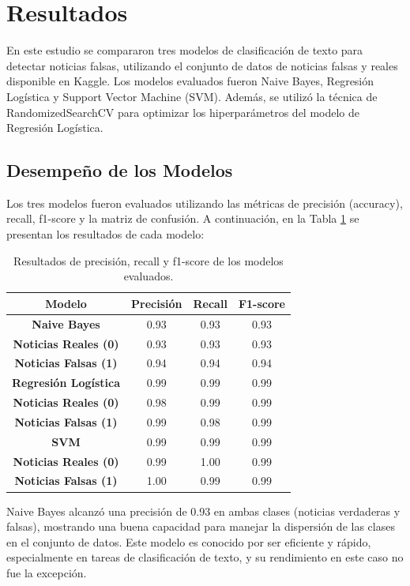 \documentclass[journal]{IEEEtran}
\begin{document}
\section{Resultados}
En este estudio se compararon tres modelos de clasificación de texto para detectar noticias falsas, utilizando el conjunto de datos de noticias falsas y reales disponible en Kaggle. Los modelos evaluados fueron Naive Bayes, Regresión Logística y Support Vector Machine (SVM). Además, se utilizó la técnica de RandomizedSearchCV para optimizar los hiperparámetros del modelo de Regresión Logística.

\subsection{Desempeño de los Modelos}

Los tres modelos fueron evaluados utilizando las métricas de precisión (accuracy), recall, f1-score y la matriz de confusión. A continuación, en la Tabla \ref{table:resultados_modelos} se presentan los resultados de cada modelo:

\begin{table}[ht]
\centering
\begin{tabular}{|c|c|c|c|}
\hline
\textbf{Modelo} & \textbf{Precisión} & \textbf{Recall} & \textbf{F1-score} \\
\hline
\textbf{Naive Bayes} & 0.93 & 0.93 & 0.93 \\
\textbf{Noticias Reales (0)} & 0.93 & 0.93 & 0.93 \\
\textbf{Noticias Falsas (1)} & 0.94 & 0.94 & 0.94 \\
\hline
\textbf{Regresión Logística} & 0.99 & 0.99 & 0.99 \\
\textbf{Noticias Reales (0)} & 0.98 & 0.99 & 0.99 \\
\textbf{Noticias Falsas (1)} & 0.99 & 0.98 & 0.99 \\
\hline
\textbf{SVM} & 0.99 & 0.99 & 0.99 \\
\textbf{Noticias Reales (0)} & 0.99 & 1.00 & 0.99 \\
\textbf{Noticias Falsas (1)} & 1.00 & 0.99 & 0.99 \\
\hline
\end{tabular}
\caption{Resultados de precisión, recall y f1-score de los modelos evaluados.}
\label{table:resultados_modelos}
\end{table}

Naive Bayes alcanzó una precisión de 0.93 en ambas clases (noticias verdaderas y falsas), mostrando una buena capacidad para manejar la dispersión de las clases en el conjunto de datos. Este modelo es conocido por ser eficiente y rápido, especialmente en tareas de clasificación de texto, y su rendimiento en este caso no fue la excepción.
\end{document}
